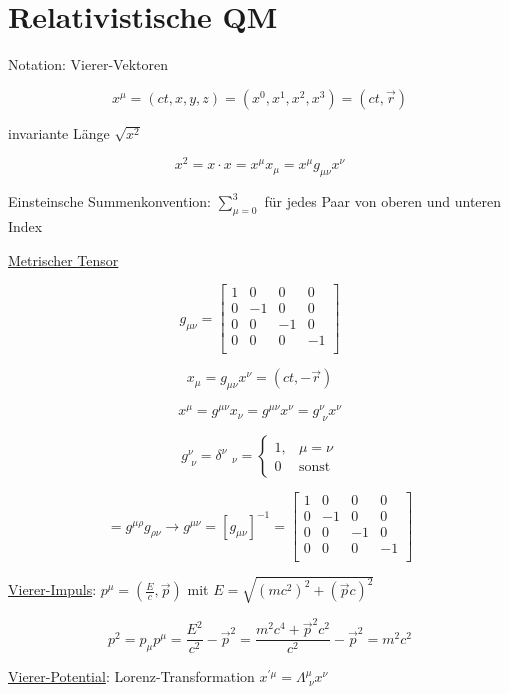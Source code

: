 



\tableofcontents
\setcounter{chapter}{5}
\chapter{Relativistische QM}



Notation: Vierer-Vektoren

\[x^{\mu} = (ct,x,y,z) = (x^0,x^1,x^2,x^3) = (ct,\vec r)\]

invariante Länge \(\sqrt{x^2}\)

\[x^2=x\cdot x = x^{\mu}x_\mu = x^\mu g_{\mu \nu}x^\nu\]

Einsteinsche Summenkonvention: \(\sum_{\mu=0}^3\) für jedes Paar von oberen und unteren Index

\underline{Metrischer Tensor}

\[ g_{\mu\nu} = \begin{bmatrix}
 1 & 0 & 0 & 0\\
 0 & -1 & 0 & 0\\
 0 & 0 & -1 & 0\\
 0 & 0 & 0 & -1\\
\end{bmatrix} \]

\[ x_\mu = g_{\mu\nu}x^\nu = (ct,-\vec r)\]

\[x^\mu = g^{\mu\nu}x_\nu = g^{\mu\nu}x^\nu = g^\nu_{\,\,\nu} x^\nu\] 

\[g^\nu_{\,\,\nu} = \delta^\nu{\,\,_\nu} =\begin{cases}
  1,  & \mu = \nu\\
  0 & \text{sonst}
\end{cases} \]

\[= g^{\mu\rho}g_{\rho\nu} \rightarrow  g^{\mu\nu} = [g_{\mu\nu}]^{-1} = \begin{bmatrix}
 1 & 0 & 0 & 0\\
 0 & -1 & 0 & 0\\
 0 & 0 & -1 & 0\\
 0 & 0 & 0 & -1\\
\end{bmatrix} \]

\underline{Vierer-Impuls}: \(p^\mu=(\frac{E}{c},\vec p)\)  mit  \(E= \sqrt{(mc^2)^2+(\vec p c)^2}\)

\[p^2 = p_\mu p^\mu = \frac{E^2}{c^2}-\vec p^2 = \frac{m^2c^4+\vec p^2 c^2}{c^2} - \vec p^2 = m^2c^2\]

\underline{Vierer-Potential}:  Lorenz-Transformation \(x^{'\mu} = \Lambda^{\mu}_{\,\,\nu} x^\nu\)


